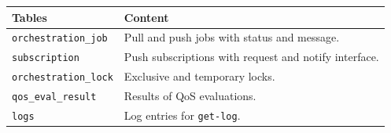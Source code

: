 \documentclass[a4paper]{arrowhead}
\begin{document}
\noindent\begin{longtable}{| p{6.4cm} | p{8.8cm} |} \hline
\rowcolor{gray!33} Tables & Content \\ \hline \endhead
\texttt{orchestration\_\allowbreak{}job} & Pull and push jobs with status and message. \\ \hline
\texttt{subscription} & Push subscriptions with request and notify interface. \\ \hline
\texttt{orchestration\_\allowbreak{}lock} & Exclusive and temporary locks. \\ \hline
\texttt{qos\_\allowbreak{}eval\_\allowbreak{}result} & Results of QoS evaluations. \\ \hline
\texttt{logs} & Log entries for \texttt{get-\allowbreak{}log}. \\ \hline
\end{longtable}
\end{document}
